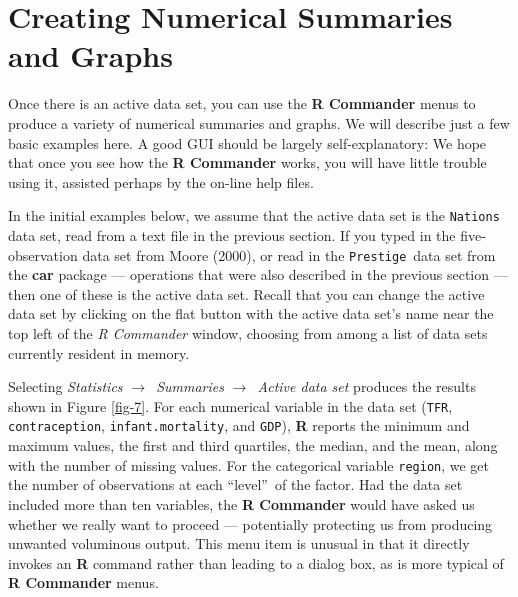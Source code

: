 \documentclass{article}%
\begin{document}
\section{Creating Numerical Summaries and Graphs}

Once there is an active data set, you can use the \textbf{R Commander} menus
to produce a variety of numerical summaries and graphs. We will describe just
a few basic examples here. A good GUI should be largely self-explanatory: We
hope that once you see how the \textbf{R Commander} works, you will have
little trouble using it, assisted perhaps by the on-line help files.

In the initial examples below, we assume that the active data set is the
\texttt{Nations} data set, read from a text file in the previous section. If
you typed in the five-observation data set from Moore (2000), or read in the
\texttt{Prestige}\ data set from the \textbf{car} package --- operations that
were also described in the previous section --- then one of these is the
active data set. Recall that you can change the active data set by clicking on
the flat button with the active data set's name near the top left of the
\emph{R Commander} window, choosing from among a list of data sets currently
resident in memory.

Selecting \emph{Statistics }$\longrightarrow$\emph{\ Summaries }%
$\longrightarrow$\emph{\ Active data set} produces the results shown in Figure
\ref{fig-7}. For each numerical variable in the data set (\texttt{TFR},
\texttt{contraception}, \texttt{infant.mortality}, and \texttt{GDP}),
\textbf{R} reports the minimum and maximum values, the first and third
quartiles, the median, and the mean, along with the number of missing values.
For the categorical variable \texttt{region}, we get the number of
observations at each \textquotedblleft level\textquotedblright\ of the factor.
Had the data set included more than ten variables, the \textbf{R Commander}
would have asked us whether we really want to proceed --- potentially
protecting us from producing unwanted voluminous output. This menu item is
unusual in that it directly invokes an \textbf{R} command rather than leading
to a dialog box, as is more typical of \textbf{R Commander} menus.%
\end{document}
